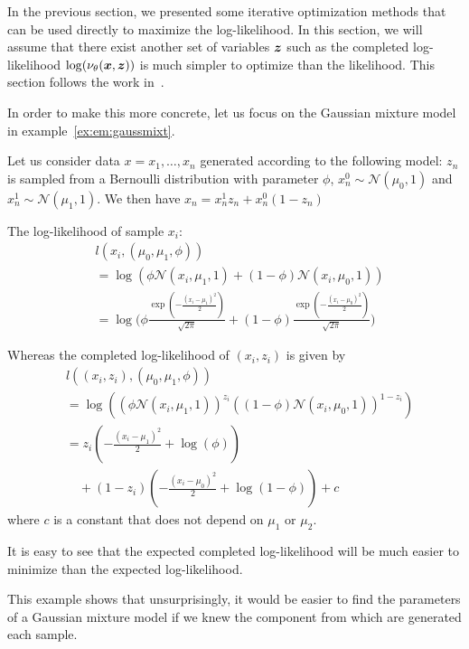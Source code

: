 In the previous section, we presented some iterative
optimization methods that can be used directly to maximize the log-likelihood.
In this section, we will assume that there exist another set of variables $\boldsymbol{z}$
such as the completed log-likelihood $\log(\nu_{\theta}(\boldsymbol{x}, \boldsymbol{z}))$ is much
simpler to optimize than the likelihood.
This section follows the work in~\cite{neal1998view}.

In order to make this more concrete, let us focus on the Gaussian mixture model
in example~\ref{ex:em:gaussmixt}.
\begin{example}
  \label{ex:em:gaussmixt}
  Let us consider data $x = x_1, \dots, x_n$ generated according to the following model:
  $z_n$ is sampled from a Bernoulli distribution with parameter $\phi$, 
  $x^0_n \sim \mathcal{N}(\mu_0, 1)$ and 
  $x^1_n \sim \mathcal{N}(\mu_1, 1)$.
  We then have $x_n = x^1_nz_n + x_n^0(1 - z_n)$

  The log-likelihood of sample $x_i$:
  \begin{align}
    &l(x_i, (\mu_0, \mu_1, \phi)) \\ &= \log(\phi \mathcal{N}(x_i, \mu_1, 1) + (1 - \phi) \mathcal{N}(x_i, \mu_0, 1)) \\
                                                   &= \log\Big( \phi\frac{\exp(-\frac{(x_i - \mu_1)^2}{2})}{\sqrt{2 \pi}} + (1 - \phi)\frac{\exp(-\frac{(x_i - \mu_0)^2}{2})}{\sqrt{2 \pi}} \Big)
  \end{align}

  Whereas the completed log-likelihood of $(x_i, z_i)$ is given by
  \begin{align}
    &l((x_i, z_i), (\mu_0, \mu_1, \phi)) \\
    &= \log((\phi \mathcal{N}(x_i, \mu_1, 1))^{z_i} ((1 - \phi) \mathcal{N}(x_i, \mu_0, 1))^{1- z_i}) \\
    &= z_i ( -\frac{(x_i - \mu_1)^2}{2} + \log(\phi)) \\ &\enspace \enspace + (1 - z_i) ( -\frac{(x_i - \mu_0)^2}{2} + \log(1 -\phi)) + c
  \end{align}
  where $c$ is a constant that does not depend on $\mu_1$ or $\mu_2$.

  It is easy to see that the expected completed log-likelihood will be
  much easier to minimize than the expected log-likelihood.
\end{example}
This example shows that unsurprisingly, it would be easier to find the parameters of a
Gaussian mixture model if we knew the component from which are generated each sample.

